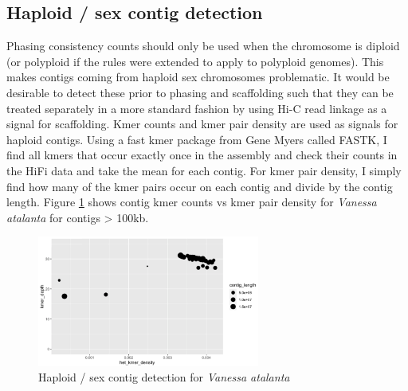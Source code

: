 \subsection{Haploid / sex contig detection}

\par{
Phasing consistency counts should only be used when the chromosome is diploid (or polyploid if the rules were extended to apply to polyploid genomes). This makes contigs coming from haploid sex chromosomes problematic. It would be desirable to detect these prior to phasing and scaffolding such that they can be treated separately in a more standard fashion by using Hi-C read linkage as a signal for scaffolding. Kmer counts and kmer pair density are used as signals for haploid contigs. Using a fast kmer package from Gene Myers called FASTK\cite{fastk}, I find all kmers that occur exactly once in the assembly and check their counts in the HiFi data and take the mean for each contig. For kmer pair density, I simply find how many of the kmer pairs occur on each contig and divide by the contig length. Figure \ref{figure:sexcontig} shows contig kmer counts vs kmer pair density for \textit{Vanessa atalanta} for contigs > 100kb.
}

\begin{figure}[htbp!]
\caption{Haploid / sex contig detection for \textit{Vanessa atalanta}}
\label{figure:sexcontig}
\begin{centering}
\includegraphics[width=0.65\textwidth]{sexcontig.png}
\end{centering}

\end{figure}

